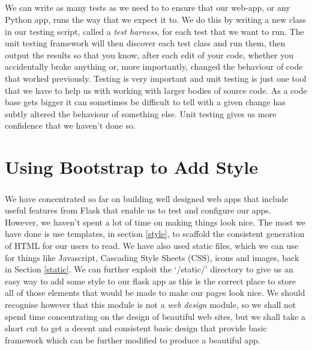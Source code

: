 \documentclass[12pt, a4paper, oneside]{book}
\begin{document}
\paragraph{} We can write as many tests as we need to to ensure that our web-app, or any Python app, runs the way that we expect it to. We do this by writing a new class in our testing script, called a \emph{test harness}, for each test that we want to run. The unit testing framework will then discover each test class and run them, then output the results so that you know, after each edit of your code, whether you accidentally broke anything or, more importantly, changed the behaviour of code that worked previously. Testing is very important and unit testing is just one tool that we have to help us with working with larger bodies of source code. As a code base gets bigger it can sometimes be difficult to tell with a given change has subtly altered the behaviour of something else. Unit testing gives us more confidence that we haven't done so.



\chapter{Using Bootstrap to Add Style}
\label{lab07}
\paragraph{} We have concentrated so far on building well designed web apps that include useful features from Flask that enable us to test and configure our apps. However, we haven't spent a lot of time on making things look nice. The most we have done is use templates, in section \ref{style}, to scaffold the consistent generation of HTML for our users to read. We have also used static files, which we can use for things like Javascript, Cascading Style Sheets (CSS), icons and images, back in Section \ref{static}. We can further exploit the `/static/' directory to give us an easy way to add some style to our flask app as this is the correct place to store all of those elements that would be made to make our pages look nice. We should recognise however that this module is not a \emph{web design} module, so we shall not spend time concentrating on the design of beautiful web sites, but we shall take a short cut to get a decent and consistent basic design that provide basic framework which can be further modified to produce a beautiful app.
\end{document}
